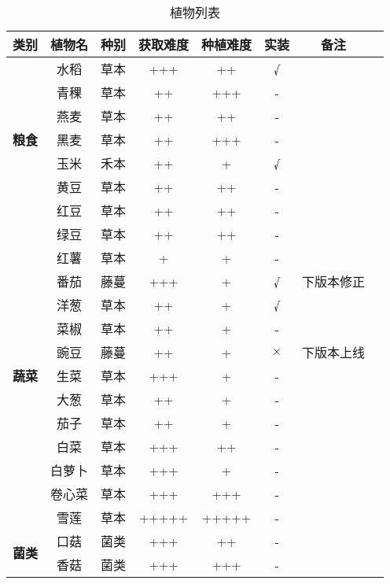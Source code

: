 \begin{center}
    \setlength{\tabcolsep}{4mm}
    \begin{longtable}{c|cc|ccccc}
        \caption{植物列表} \\
        \toprule
        \textbf{类别} &\textbf{植物名} &  \textbf{种别} & \textbf{获取难度}  & \textbf{种植难度}  & \textbf{实装} & \textbf{备注} \\
        \midrule
        \multirow{7}{*}{\textbf{粮食}}& 水稻   & 草本  & +++    & ++ & √ &         \\
        & 青稞 & 草本 & ++ & +++ & - & \\
        & 燕麦 & 草本 & ++ & ++ & - & \\
        & 黑麦 & 草本 & ++ & +++ & - & \\
        & 玉米   & 禾本  & ++    & + & √ &         \\
        & 黄豆   & 草本  & ++    & ++ & - &         \\
        & 红豆   & 草本  & ++    & ++ & - &         \\
        & 绿豆   & 草本  & ++    & ++ & - &         \\
        & 红薯   & 草本  & +    & + & - &         \\
        \midrule
        \multirow{9}{*}{\textbf{蔬菜}}& 番茄   & 藤蔓  & +++    & + &  √ &  下版本修正  \\
        & 洋葱   & 草本  & ++    & + & √ &         \\
        & 菜椒   & 草本  & ++    & + & -  &        \\
        & 豌豆   & 藤蔓  & ++    & + & $\times$ &  下版本上线  \\
        & 生菜   & 草本  & +++   & + & - &        \\
        & 大葱   & 草本  & ++    & + & - &        \\
        & 茄子   & 草本  & ++    & + & - &        \\
        & 白菜   & 草本  & +++    & ++ & - &      \\
        & 白萝卜   & 草本  & +++ & + & - &        \\
        & 卷心菜   & 草本  & +++    & +++ & - &        \\
        & 雪莲   & 草本  & +++++    & +++++ & - &         \\
        \midrule
        \multirow{6}{*}{\textbf{菌类}}& 口菇   & 菌类  & +++    & ++ & - &   \\
        & 香菇   & 菌类  & +++    & +++ & - &        \\

\end{longtable}
\end{center}
